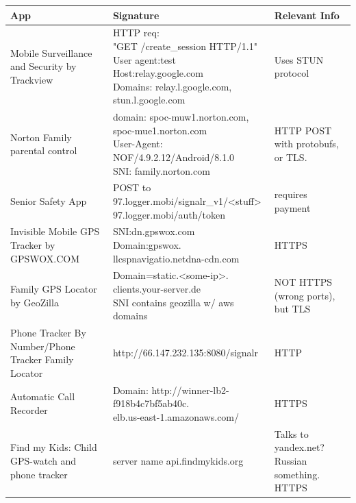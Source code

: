 \documentclass[acmtog]{acmart}
\begin{document}
\begin{table}
	\begin{tabular}{p{5cm}p{5cm}p{5cm}}
		\toprule
		App & Signature & Relevant Info \\
		\midrule
		Mobile Surveillance and Security
		by Trackview & \makecell{HTTP req:\\ "GET /create\_session HTTP/1.1"\\ 
		User agent:test \\Host:relay.google.com\\
			Domains: relay.l.google.com,\\ stun.l.google.com} & Uses STUN 
			protocol \\
		
		Norton Family parental control & \makecell{domain: 
		spoc-muw1.norton.com,\\spoc-mue1.norton.com\\
			User-Agent: NOF/4.9.2.12/Android/8.1.0\\
			SNI: family.norton.com} & HTTP POST with protobufs, or TLS. \\
		
		Senior Safety App & \makecell{POST to 
		\\97.logger.mobi/signalr\_v1/<stuff>\\
			97.logger.mobi/auth/token} & requires payment\\
		
		Invisible Mobile GPS Tracker by
		GPSWOX.COM & \makecell{SNI:dn.gpswox.com\\ 
		Domain:gpswox.\\llcspnavigatio.netdna-cdn.com} & HTTPS \\
		
		Family GPS Locator by GeoZilla & 
		\makecell{Domain=static.<some-ip>.\\clients.your-server.de\\
			SNI contains geozilla w/ aws domains} & NOT HTTPS (wrong ports), 
			but TLS \\
		
		Phone Tracker By Number/Phone Tracker Family Locator & 
		http://66.147.232.135:8080/signalr & HTTP \\
		
		Automatic Call Recorder & \makecell{Domain: 
		http://winner-lb2-\\f918b4c7bf5ab40c.\\elb.us-east-1.amazonaws.com/ }& 
		HTTPS \\
		
		Find my Kids: Child GPS-watch and phone tracker & server name 
		api.findmykids.org & Talks to yandex.net? Russian something. 
		HTTPS \\
		

\end{tabular}
\end{table}
\end{document}
